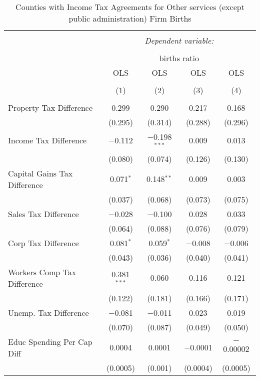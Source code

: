 
\begin{table}[!htbp] \centering 
  \caption{Counties with Income Tax Agreements for  Other services (except public administration) Firm Births} 
  \label{81rd} 
\begin{tabular}{@{\extracolsep{5pt}}lcccc} 
\\[-1.8ex]\hline 
\hline \\[-1.8ex] 
 & \multicolumn{4}{c}{\textit{Dependent variable:}} \\ 
\cline{2-5} 
\\[-1.8ex] & \multicolumn{4}{c}{births ratio} \\ 
 & OLS & OLS & OLS & OLS \\ 
\\[-1.8ex] & (1) & (2) & (3) & (4)\\ 
\hline \\[-1.8ex] 
 Property Tax Difference & 0.299 & 0.290 & 0.217 & 0.168 \\ 
  & (0.295) & (0.314) & (0.288) & (0.296) \\ 
  Income Tax Difference & $-$0.112 & $-$0.198$^{***}$ & 0.009 & 0.013 \\ 
  & (0.080) & (0.074) & (0.126) & (0.130) \\ 
  Capital Gains Tax Difference & 0.071$^{*}$ & 0.148$^{**}$ & 0.009 & 0.003 \\ 
  & (0.037) & (0.068) & (0.073) & (0.075) \\ 
  Sales Tax Difference & $-$0.028 & $-$0.100 & 0.028 & 0.033 \\ 
  & (0.064) & (0.088) & (0.076) & (0.079) \\ 
  Corp Tax Difference & 0.081$^{*}$ & 0.059$^{*}$ & $-$0.008 & $-$0.006 \\ 
  & (0.043) & (0.036) & (0.040) & (0.041) \\ 
  Workers Comp Tax Difference & 0.381$^{***}$ & 0.060 & 0.116 & 0.121 \\ 
  & (0.122) & (0.181) & (0.166) & (0.171) \\ 
  Unemp. Tax Difference & $-$0.081 & $-$0.011 & 0.023 & 0.019 \\ 
  & (0.070) & (0.087) & (0.049) & (0.050) \\ 
  Educ Spending Per Cap Diff & 0.0004 & 0.0001 & $-$0.0001 & $-$0.00002 \\ 
  & (0.0005) & (0.001) & (0.0004) & (0.0005) \\ 

\end{tabular}
\end{table}
